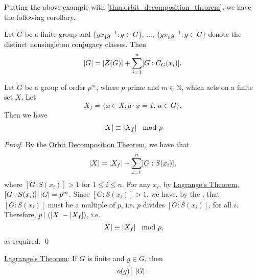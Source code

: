 Putting the above example with \cref{thm:orbit_decomposition_theorem}, we have the following corollary.

\begin{crly}
\label{crly:class_equation}
  Let $G$ be a finite group and $\{gx_1 g^{-1} : g \in G \}, \, ..., \, \{g x_n g^{-1} : g \in G \}$ denote the distinct nonsingleton conjugacy classes. Then
  \begin{equation*}
    \left|G\right| = \left|Z(G)\right| + \sum_{i=1}^{n} [ G : C_G(x_i) ].
  \end{equation*}
\end{crly}

\begin{lemma}
\label{lemma:abs_x_equiv_abs_x_f}
  Let $G$ be a group of order $p^m$, where $p$ prime and $m \in \mathbb{N}$, which acts on a finite set $X$. Let
  \begin{equation*}
    X_f = \{ x \in X : a \cdot x = x, \, a \in G \}.
  \end{equation*}
  Then we have
  \begin{equation*}
    \left|X\right| \equiv \left|X_f\right| \mod p
  \end{equation*}
\end{lemma}

\begin{proof}
  By the \hyperref[thm:orbit_decomposition_theorem]{Orbit Decomposition Theorem}, we have that
  \begin{equation*}
    \left|X\right| = \left|X_f\right| + \sum_{i=1}^{n} [ G : S(x_i) ],
  \end{equation*}
  where $[ G : S(x_i) ] > 1$ for $1 \leq i \leq n$. For any $x_i$, by \hyperref[thm:lagrange_s_theorem]{Lagrange's Theorem}, $[ G : S(x_i) ] \big| \left|G\right| = p^m$. Since $[ G : S(x_i) ] > 1$, we have, by the , that $[ G : S(x_i) ]$ must be a multiple of $p$, i.e. $p$ divides $[ G : S(x_i) ]$, for all $i$. Therefore, $p \, | \, \left( \left|X\right| - \left|X_f\right| \right)$, i.e.
  \begin{equation*}
    \left|X\right| \equiv \left|X_f\right| \mod p,
  \end{equation*}
  as required. \qed
\end{proof}

 \hyperref[thm:lagrange_s_theorem]{Lagrange's Theorem}: If $G$ is finite and $g \in G$, then
\begin{equation*}
  o(g) \, \big| \, \left|G\right|.
\end{equation*}

